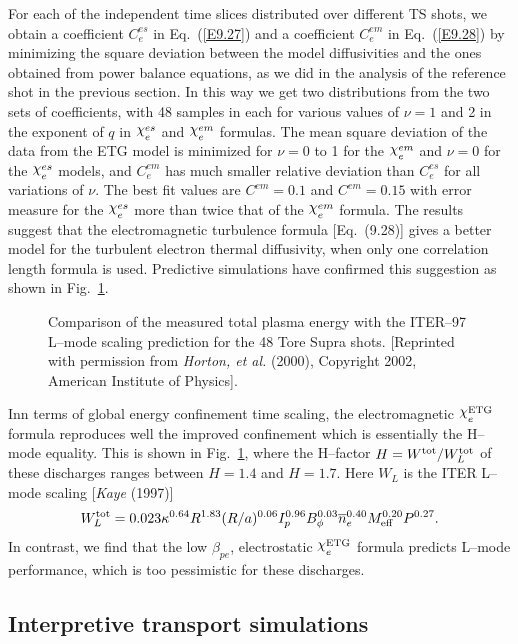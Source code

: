 \documentclass[a4paper,openany,12pt]{book}
\def\chix{\raise.5ex\hbox{$\chi$}}
\begin{document}
For each of the independent time slices distributed over different TS shots, we obtain a coefficient $C_e^{es}$ in Eq.~(\ref{E9.27}) and a coefficient $C_e^{em}$ in Eq.~(\ref{E9.28}) by minimizing the square deviation between the model diffusivities and the ones obtained from power balance equations, as we did in the analysis of the reference shot in the previous section. In this way we get two distributions from the two sets of coefficients, with 48 samples in each for various values of $\nu=1$ and 2 in the exponent of $q$ in $\chix_e^{es}$ and $\chix_e^{em}$ formulas. The mean square deviation of the data from the ETG model is minimized for $\nu=0$ to 1 for the $\chix_e^{em}$ and $\nu=0$ for the $\chix_e^{es}$ models, and $C_e^{em}$ has much smaller relative deviation than $C_e^{es}$ for all variations of $\nu$. The best fit values are $C^{em}=0.1$ and $C^{em}=0.15$ with error measure for the $\chix_e^{es}$ more than twice that of the $\chix_e^{em}$ formula. The results suggest that the electromagnetic turbulence formula [Eq.~(9.28)] gives a better model for the turbulent electron thermal diffusivity, when only one correlation length formula is used. Predictive simulations have confirmed this suggestion as shown in Fig.~\ref{F9.9}.
%
\begin{figure}[H]
\centerline{}
\caption{Comparison of the measured total plasma energy with the ITER--97 L--mode scaling prediction for the 48 Tore Supra shots. [Reprinted with permission from \emph{Horton, et al.} (2000), Copyright 2002, American Institute of Physics].}
\label{F9.9}
\end{figure}
%

Inn terms of global energy confinement time scaling, the electromagnetic $\chix_e^{\rm ETG}$ formula reproduces well the improved confinement which is essentially the H--mode equality. This is shown in Fig.~\ref{F9.9}, where the H--factor $H=W^{\rm tot}/W_L^{\rm tot}$ of these discharges ranges between $H=1.4$ and $H=1.7$. Here $W_L$ is the ITER L--mode scaling [\emph{Kaye} (1997)]
\begin{equation}
W_L^{\rm tot}=0.023\kappa^{0.64}R^{1.83}(R/a)^{0.06}I_p^{0.96}B_\phi^{0.03}\overline n_e^{0.40} M_{\rm eff}^{0.20}P^{0.27}.\label{E9.33}
\end{equation}
In contrast, we find that the low $\beta_{pe}$, electrostatic $\chix_e^{\rm ETG}$ formula predicts L--mode performance, which is too pessimistic for these discharges.

\subsection{Interpretive transport simulations}
\end{document}
